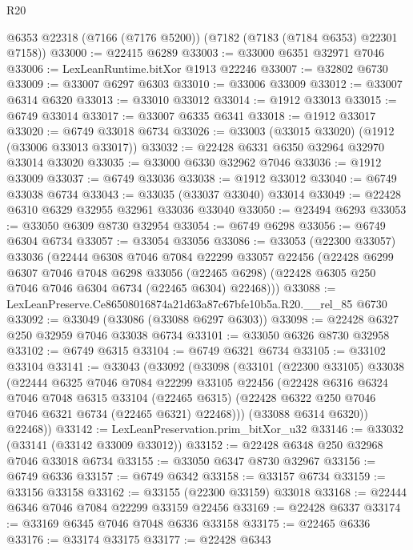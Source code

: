 \begin{lexlean}{R20}
\begin{coremodule}
{    @6353
    @22318
    (@7166 (@7176 @5200))
    (@7182 (@7183 (@7184 @6353) @22301 @7158))
@33000 := @22415 @6289
@33003 := @33000 @6351 @32971 @7046
@33006 := LexLeanRuntime.bitXor @1913 @22246
@33007 := @32802 @6730
@33009 := @33007 @6297 @6303
@33010 := @33006 @33009
@33012 := @33007 @6314 @6320
@33013 := @33010 @33012
@33014 := @1912 @33013
@33015 := @6749 @33014
@33017 := @33007 @6335 @6341
@33018 := @1912 @33017
@33020 := @6749 @33018 @6734
@33026 := @33003 (@33015 @33020) (@1912 (@33006 @33013 @33017))
@33032 := @22428 @6331 @6350 @32964 @32970 @33014 @33020
@33035 := @33000 @6330 @32962 @7046
@33036 := @1912 @33009
@33037 := @6749 @33036
@33038 := @1912 @33012
@33040 := @6749 @33038 @6734
@33043 := @33035 (@33037 @33040) @33014
@33049 := @22428 @6310 @6329 @32955 @32961 @33036 @33040
@33050 := @23494 @6293
@33053 := @33050 @6309 @8730 @32954
@33054 := @6749 @6298
@33056 := @6749 @6304 @6734
@33057 := @33054 @33056
@33086 := @33053
    (@22300 @33057)
    @33036
    (@22444
      @6308
      @7046
      @7084
      @22299
      @33057
      @22456
      (@22428
        @6299
        @6307
        @7046
        @7048
        @6298
        @33056
        (@22465 @6298)
        (@22428 @6305 @250 @7046 @7046 @6304 @6734 (@22465 @6304) @22468)))
@33088 := LexLeanPreserve.Ce86508016874a21d63a87c67bfe10b5a.R20.__rel_85 @6730
@33092 := @33049 (@33086 (@33088 @6297 @6303))
@33098 := @22428 @6327 @250 @32959 @7046 @33038 @6734
@33101 := @33050 @6326 @8730 @32958
@33102 := @6749 @6315
@33104 := @6749 @6321 @6734
@33105 := @33102 @33104
@33141 := @33043
    (@33092
      (@33098
        (@33101
          (@22300 @33105)
          @33038
          (@22444
            @6325
            @7046
            @7084
            @22299
            @33105
            @22456
            (@22428
              @6316
              @6324
              @7046
              @7048
              @6315
              @33104
              (@22465 @6315)
              (@22428 @6322 @250 @7046 @7046 @6321 @6734 (@22465 @6321) @22468)))
          (@33088 @6314 @6320))
        @22468))
@33142 := LexLeanPreservation.prim_bitXor_u32
@33146 := @33032 (@33141 (@33142 @33009 @33012))
@33152 := @22428 @6348 @250 @32968 @7046 @33018 @6734
@33155 := @33050 @6347 @8730 @32967
@33156 := @6749 @6336
@33157 := @6749 @6342
@33158 := @33157 @6734
@33159 := @33156 @33158
@33162 := @33155 (@22300 @33159) @33018
@33168 := @22444 @6346 @7046 @7084 @22299 @33159 @22456
@33169 := @22428 @6337
@33174 := @33169 @6345 @7046 @7048 @6336 @33158
@33175 := @22465 @6336
@33176 := @33174 @33175
@33177 := @22428 @6343
}
\end{coremodule}
\end{lexlean}
